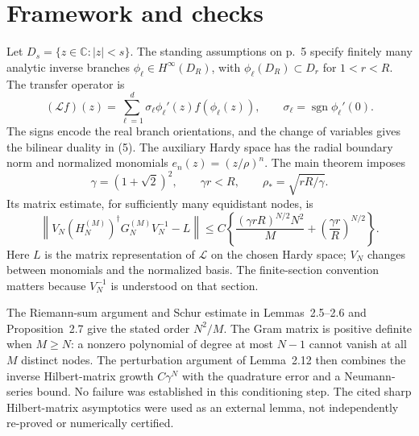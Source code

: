 \documentclass[10pt]{article}
\begin{document}
\section*{Framework and checks}
Let \(D_s=\{z\in\mathbb C:|z|<s\}\). The standing assumptions on p. 5 specify finitely many analytic inverse branches \(\phi_\ell\in H^\infty(D_R)\), with \(\phi_\ell(D_R)\subset D_r\) for \(1<r<R\). The transfer operator is \[(\mathcal Lf)(z)=\sum_{\ell=1}^d
 \sigma_\ell\phi_\ell'(z)f(\phi_\ell(z)),\qquad
 \sigma_\ell=\operatorname{sgn}\phi_\ell'(0).\] The signs encode the real branch orientations, and the change of variables gives the bilinear duality in (5). The auxiliary Hardy space has the radial boundary norm and normalized monomials \(e_n(z)=(z/\rho)^n\). The main theorem imposes \[\gamma=(1+\sqrt2)^2,\qquad \gamma r<R,\qquad
 \rho_*=\sqrt{rR/\gamma}.\] Its matrix estimate, for sufficiently many equidistant nodes, is \[\left\lVert V_N(H_N^{(M)})^\dagger G_N^{(M)}V_N^{-1}-L\right\rVert
 \le C\left\{\frac{(\gamma rR)^{N/2}N^2}{M}
                 +\left(\frac{\gamma r}{R}\right)^{N/2}\right\}.\] Here \(L\) is the matrix representation of \(\mathcal L\) on the chosen Hardy space; \(V_N\) changes between monomials and the normalized basis. The finite-section convention matters because \(V_N^{-1}\) is understood on that section.\par
The Riemann-sum argument and Schur estimate in Lemmas 2.5–2.6 and Proposition 2.7 give the stated order \(N^2/M\). The Gram matrix is positive definite when \(M\ge N\): a nonzero polynomial of degree at most \(N-1\) cannot vanish at all \(M\) distinct nodes. The perturbation argument of Lemma 2.12 then combines the inverse Hilbert-matrix growth \(C\gamma^N\) with the quadrature error and a Neumann-series bound. No failure was established in this conditioning step. The cited sharp Hilbert-matrix asymptotics were used as an external lemma, not independently re-proved or numerically certified.\par
\end{document}
